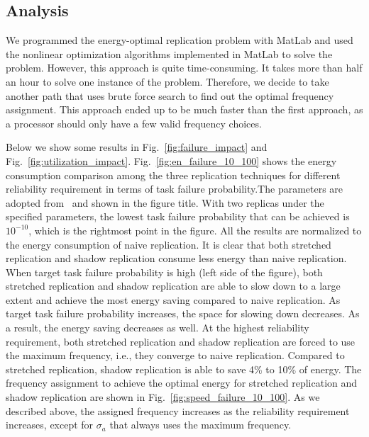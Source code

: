 \subsection{Analysis}
We programmed the energy-optimal replication problem with MatLab and used the nonlinear optimization algorithms implemented in MatLab to solve the problem. However, this approach is quite time-consuming. It takes more than half an hour to solve one instance of the problem. Therefore, we decide to take another path that uses brute force search to find out the optimal frequency assignment. This approach ended up to be much faster than the first approach, as a processor should only have a few valid frequency choices. 

Below we show some results in Fig.~\ref{fig:failure_impact} and Fig.~\ref{fig:utilization_impact}. Fig.~\ref{fig:en_failure_10_100} shows the energy consumption comparison among the three replication techniques for different reliability requirement in terms of task failure probability.The parameters are adopted from~\cite{6604518} and shown in the figure title. With two replicas under the specified parameters, the lowest task failure probability that can be achieved is $10^{-10}$, which is the rightmost point in the figure.  
All the results are normalized to the energy consumption of naive replication. It is clear that both stretched replication and shadow replication consume less energy than naive replication. When target task failure probability is high (left side of the figure), both stretched replication and shadow replication are able to slow down to a large extent and achieve the most energy saving compared to naive replication. As target task failure probability increases, the space for slowing down decreases. As a result, the energy saving decreases as well. At the highest reliability requirement, both stretched replication and shadow replication are forced to use the maximum frequency, i.e., they converge to naive replication. Compared to stretched replication, shadow replication is able to save 4\% to 10\% of energy. The frequency assignment to achieve the optimal energy for stretched replication and shadow replication are shown in Fig.~\ref{fig:speed_failure_10_100}. As we described above, the assigned frequency increases as the reliability requirement increases, except for $\sigma_a$ that always uses the maximum frequency.

